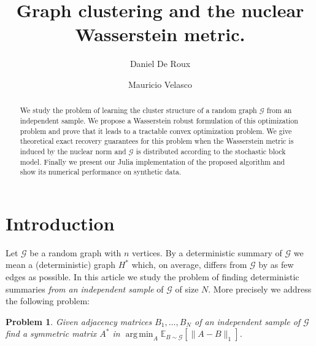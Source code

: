 \documentclass[12pt]{amsart}
\newtheorem{problem}[lemma]{Problem}
\theoremstyle{remark}
\DeclareMathOperator*{\argmin}{arg\,min}
\newcommand{\EE}{\mathbb{E}}
\newcommand{\grG}{{\mathcal{G}}}
\begin{document}
\author{Daniel De Roux}
\address{
Departamento de matem\'aticas\\
Universidad de los Andes\\
Carrera $1^{\rm ra}\#18A-12$\\ 
Bogot\'a, Colombia
}

\author{Mauricio Velasco}
\address{
Departamento de matem\'aticas\\
Universidad de los Andes\\
Carrera $1^{\rm ra}\#18A-12$\\ 
Bogot\'a, Colombia
}


\begin{abstract} We study the problem of learning the cluster structure of a random graph $\grG$ from an independent sample. We propose a Wasserstein robust formulation of this optimization problem and prove that it leads to a tractable convex optimization problem. We give theoretical exact recovery guarantees for this problem when the Wasserstein metric is induced by the nuclear norm and $\grG$ is distributed according to the stochastic block model. Finally we present our Julia implementation of the proposed algorithm and show its numerical performance on synthetic data.
\end{abstract} 

\title{Graph clustering and the nuclear Wasserstein metric.}
\maketitle

\section{Introduction}


Let $\grG$ be a random graph with $n$ vertices. By a deterministic summary of $\grG$ we mean a (deterministic) graph $H^*$ which, on average, differs from $\grG$ by as few edges as possible. In this article we study the problem of finding deterministic summaries {\it from an independent sample} of $\grG$ of size $N$. More precisely we address the following problem:

\begin{problem}\label{Prob} Given adjacency matrices $B_1,\dots, B_N$ of an independent sample of $\grG$ find a symmetric matrix $A^*$ in $\argmin_A \EE_{B\sim \grG}[\|A-B\|_1]$. 
\end{problem}
\end{document}
